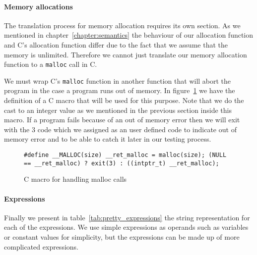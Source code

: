 \paragraph{Memory allocations}

The translation process for memory allocation requires its own section.
As we mentioned in chapter~\ref{chapter:semantics} the behaviour of our allocation function and C's allocation function differ due to the fact that we assume that the memory is unlimited.
Therefore we cannot just translate our memory allocation function to a \verb|malloc| call in C.

We must wrap C's \verb|malloc| function in another function that will abort the program in the case a program runs out of memory.
In figure~\ref{fig:macro_malloc} we have the definition of a C macro that will be used for this purpose.
Note that we do the cast to an integer value as we mentioned in the previous section inside this macro.
If a program fails because of an out of memory error then we will exit with the 3 code which we assigned as an user defined code to indicate out of memory error and to be able to catch it later in our testing process.


\begin{figure}
\begin{lstlisting}[mathescape=true]
#define __MALLOC(size) __ret_malloc = malloc(size); (NULL == __ret_malloc) ? exit(3) : ((intptr_t) __ret_malloc);
\end{lstlisting}
\caption{C macro for handling malloc calls}
\label{fig:macro_malloc}
\end{figure}




\paragraph{Expressions}
Finally we present in table~\ref{tab:pretty_expressions} the string representation for each of the expressions.
We use simple expressions as operands such as variables or constant values for simplicity, but the expressions can be made up of more complicated expressions.


